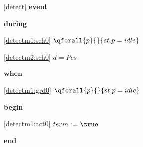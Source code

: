 \noindent \ref{detect}  \textbf{event}
\begin{block}
  \item   \textbf{during}
  \begin{block}
  \item[ \eqref{detectm1:sch0} ]\sout{$\qforall{p}{}{st.p = idle} $} %
  \end{block}
  \begin{block}
  \item[ \eqref{detectm2:sch0} ]{$d = Pcs $} %
  \end{block}
  \item   \textbf{when}
  \begin{block}
  \item[ \eqref{detectm1:grd0} ]{$\qforall{p}{}{st.p = idle} $} %
  \end{block}
  \item   \textbf{begin}
  \begin{block}
  \item[ \eqref{detectm1:act0} ]{$term \bcmeq \true$} %
  \end{block}
  \item   \textbf{end} \\
\end{block}
